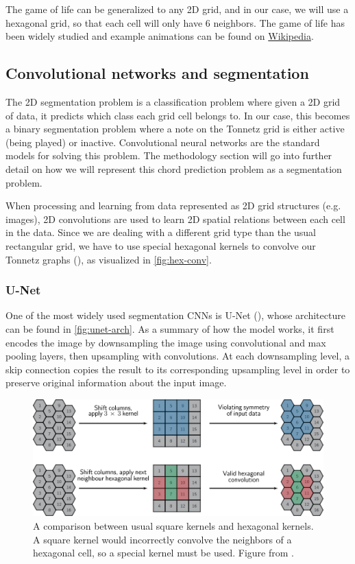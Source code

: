 \documentclass[
	a4paper, %
	10pt, %
	unnumberedsections, %
	twoside, %
]{LTJournalArticle}
\begin{document}
The game of life can be generalized to any 2D grid, and in our case, we will use a hexagonal grid, so that each cell will only have 6 neighbors. The game of life has been widely studied and example animations can be found on \href{https://en.wikipedia.org/wiki/Conway%27s_Game_of_Life}{Wikipedia}.

\subsection{Convolutional networks and segmentation}

The 2D segmentation problem is a classification problem where given a 2D grid of data, it predicts which class each grid cell belongs to. In our case, this becomes a binary segmentation problem where a note on the Tonnetz grid is either active (being played) or inactive. Convolutional neural networks are the standard models for solving this problem. The methodology section will go into further detail on how we will represent this chord prediction problem as a segmentation problem.

When processing and learning from data represented as 2D grid structures (e.g. images), 2D convolutions are used to learn 2D spatial relations between each cell in the data. Since we are dealing with a different grid type than the usual rectangular grid, we have to use special hexagonal kernels to convolve our Tonnetz graphs (\textcite{luo_hexagonal_2019}), as visualized in \autoref{fig:hex-conv}.

\subsubsection{U-Net}

One of the most widely used segmentation CNNs is U-Net (\textcite{ronneberger_u-net_2015}), whose architecture can be found in \autoref{fig:unet-arch}. As a summary of how the model works, it first encodes the image by downsampling the image using convolutional and max pooling layers, then upsampling with convolutions. At each downsampling level, a skip connection copies the result to its corresponding upsampling level in order to preserve original information about the input image.

\begin{figure}
    \centering
    \includegraphics[width=\linewidth]{images/violating_symmetry.png}
    \caption{A comparison between usual square kernels and hexagonal kernels. A square kernel would incorrectly convolve the neighbors of a hexagonal cell, so a special kernel must be used. Figure from \textcite{luo_hexagonal_2019}.}
    \label{fig:hex-conv}
\end{figure}
\end{document}
